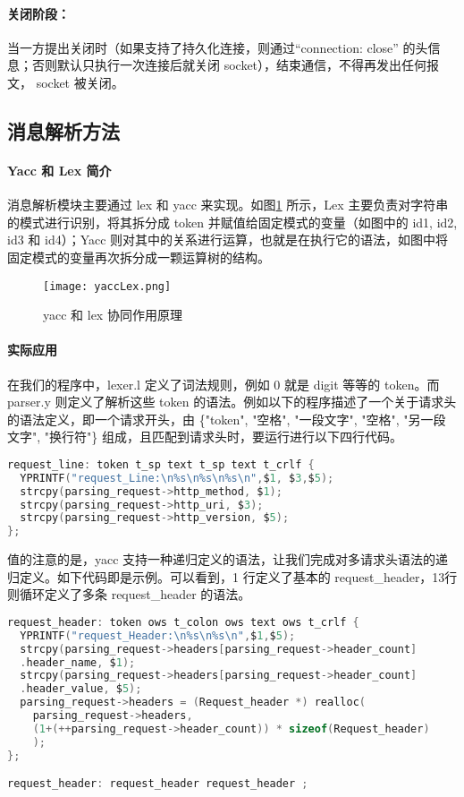 \paragraph*{关闭阶段：}当一方提出关闭时（如果支持了持久化连接，则通过“connection: close” 的头信息；否则默认只执行一次连接后就关闭 socket），结束通信，不得再发出任何报文， socket 被关闭。


\subsection{消息解析方法}

\paragraph*{Yacc 和 Lex 简介} 消息解析模块主要通过 lex 和 yacc 来实现。如图\ref{fig:yacclex} 所示，Lex 主要负责对字符串的模式进行识别，将其拆分成 token 并赋值给固定模式的变量（如图中的 id1, id2, id3 和 id4）；Yacc 则对其中的关系进行运算，也就是在执行它的语法，如图中将固定模式的变量再次拆分成一颗运算树的结构。

\begin{figure}[htbp!]
  \centering
  \texttt{[image: yaccLex.png]}
  \caption{yacc 和 lex 协同作用原理}\label{fig:yacclex}
\end{figure}

\paragraph*{实际应用} 在我们的程序中，lexer.l 定义了词法规则，例如 0 就是 digit 等等的 token。而 parser.y 则定义了解析这些 token 的语法。例如以下的程序描述了一个关于请求头的语法定义，即一个请求开头，由 \{"token", "空格", "一段文字", "空格", "另一段文字", "换行符"\} 组成，且匹配到请求头时，要运行进行以下四行代码。

\begin{lstlisting}[language=c, name=parser.y Example]
request_line: token t_sp text t_sp text t_crlf {
  YPRINTF("request_Line:\n%s\n%s\n%s\n",$1, $3,$5);
  strcpy(parsing_request->http_method, $1);
  strcpy(parsing_request->http_uri, $3);
  strcpy(parsing_request->http_version, $5);
};
\end{lstlisting}

值的注意的是，yacc 支持一种递归定义的语法，让我们完成对多请求头语法的递归定义。如下代码即是示例。可以看到，1 行定义了基本的 request\_header，13行则循环定义了多条 request\_header 的语法。

\begin{lstlisting}[language=c, name=parser.y Example of Recursive Definition]
request_header: token ows t_colon ows text ows t_crlf {
  YPRINTF("request_Header:\n%s\n%s\n",$1,$5);
  strcpy(parsing_request->headers[parsing_request->header_count]
  .header_name, $1);
  strcpy(parsing_request->headers[parsing_request->header_count]
  .header_value, $5);
  parsing_request->headers = (Request_header *) realloc(
    parsing_request->headers, 
    (1+(++parsing_request->header_count)) * sizeof(Request_header)
    ); 
};

request_header: request_header request_header ;
\end{lstlisting}

